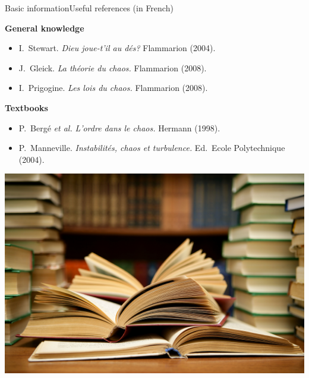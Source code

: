 \documentclass[usenames,dvipsnames,svgnames,10pt,aspectratio=169]{beamer}
\begin{document}
\begin{frame}[t, c]{Basic information}{Useful references (in French)}
	\begin{minipage}{.58\textwidth}
		\begin{block}{\centering \textbf{General knowledge}}
			\begin{itemize}
				\item I.\ Stewart. \emph{Dieu joue-t'il au dés?} Flammarion (2004).

				\medskip

				\item J.\ Gleick. \emph{La théorie du chaos.} Flammarion (2008).

				\medskip

				\item I.\ Prigogine. \emph{Les lois du chaos.} Flammarion (2008).
			\end{itemize}
		\end{block}

		\medskip

		\begin{block}{\centering \textbf{Textbooks}}
			\begin{itemize}
				\item P.\ Bergé \emph{et al.} \emph{L'ordre dans le chaos.} Hermann (1998).

				\medskip

				\item P.\ Manneville. \emph{Instabilités, chaos et turbulence.} Ed.\ Ecole Polytechnique (2004).
			\end{itemize}
		\end{block}
	\end{minipage}%
	\hfill
	\begin{minipage}{.38\textwidth}
		\centering

		\includegraphics[width=\textwidth]{references}
	\end{minipage}

	\vspace{1cm}
\end{frame}
\end{document}

